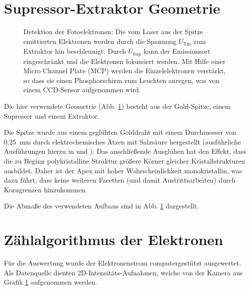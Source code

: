 \documentclass[bachelor,       %
               twoside,        %
               BCOR10mm,       %
               english,ngerman, %
               final,          %
               ]{GAUBM}
\begin{document}
\section{Supressor-Extraktor Geometrie}
\begin{figure}[h!]
	\centering
	\def\svgwidth{0.8\textwidth}
	
	\caption{Detektion der Fotoelektronen: Die vom Laser aus der Spitze emittierten Elektronen werden durch die Spannung $U_\text{Tip}$ zum Extraktor hin beschleunigt. Durch $U_\text{Sup}$ kann der Emissionsort eingeschränkt und die Elektronen fokussiert werden. Mit Hilfe einer Micro Channel Plate (MCP) werden die Einzelelektronen verstärkt, so dass sie einen Phosphorschirm zum Leuchten anregen, was von einem CCD-Sensor aufgenommen wird.}
	\label{fig:aufbau_kammer}
\end{figure}
Die hier verwendete Geometrie (Abb. \ref{fig:aufbau_kammer}) besteht aus der Gold-Spitze, einem Supressor und einem Extraktor.

Die Spitze wurde aus einem geglühten Golddraht mit einem Durchmesser von \SI{0.25}{\mm} durch elektrochemisches Ätzen mit Salzsäure hergestellt (ausführliche Ausführungen hierzu in \cite{schmidt_2012} und \cite{neacsu_2007}).
Das anschlie{\ss}ende Ausglühen hat den Effekt, dass die zu Beginn polykristalline Struktur größere Körner gleicher Kristallstrukturen ausbildet.
Daher ist der Apex mit hoher Wahrscheinlichkeit monokristallin, was dazu führt, dass keine weiteren Facetten (und damit Austrittsarbeiten) durch Korngrenzen hinzukommen.

Die Abmaße des verwendeten Aufbaus sind in Abb. \ref{fig:aufbau_kammer} dargestellt.


\section{Zählalgorithmus der Elektronen}
\label{sec:zaehlalgorithmus}
Für die Auswertung wurde der Elektronenstrom computergestützt ausgewertet.
Als Datenquelle dienten 2D-Intensitäts-Aufnahmen, welche von der Kamera aus Grafik \ref{fig:aufbau_kammer} aufgenommen werden.
\end{document}
